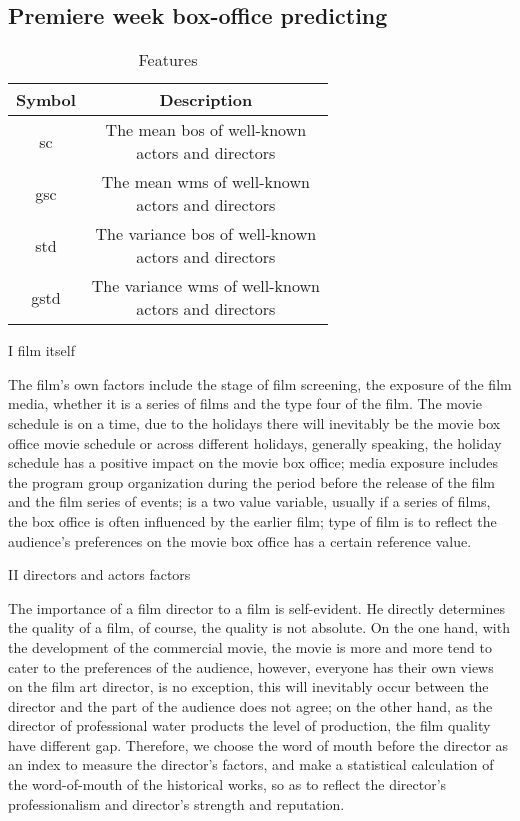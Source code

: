 \subsection{Premiere week box-office predicting}
\begin{table}[!htb]
  \centering
\begin{tabular}{|c|c|}
\hline
Symbol&Description\\
\hline
sc&\tabincell{c}{The mean bos of well-known \\ actors and directors}\\
\hline
gsc&\tabincell{c}{The mean wms of well-known \\ actors and directors}\\
\hline
std&\tabincell{c}{The variance bos of well-known \\ actors and directors}\\
\hline
gstd&\tabincell{c}{The variance wms of well-known \\ actors and directors}\\
\hline
\end{tabular}
  \caption{Features}
\end{table}
\par I film itself
\par The film's own factors include the stage of film screening, the exposure of the film media, whether it is a series of films and the type four of the film. The movie schedule is on a time, due to the holidays there will inevitably be the movie box office movie schedule or across different holidays, generally speaking, the holiday schedule has a positive impact on the movie box office; media exposure includes the program group organization during the period before the release of the film and the film series of events; is a two value variable, usually if a series of films, the box office is often influenced by the earlier film; type of film is to reflect the audience's preferences on the movie box office has a certain reference value.
\par II directors and actors factors
\par The importance of a film director to a film is self-evident. He directly determines the quality of a film, of course, the quality is not absolute. On the one hand, with the development of the commercial movie, the movie is more and more tend to cater to the preferences of the audience, however, everyone has their own views on the film art director, is no exception, this will inevitably occur between the director and the part of the audience does not agree; on the other hand, as the director of professional water products the level of production, the film quality have different gap. Therefore, we choose the word of mouth before the director as an index to measure the director's factors, and make a statistical calculation of the word-of-mouth of the historical works, so as to reflect the director's professionalism and director's strength and reputation.
